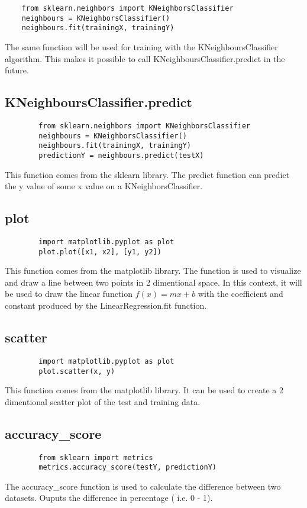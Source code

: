 \documentclass[titlepage, 11pt]{article}
\begin{document}
	\begin{lstlisting}
	from sklearn.neighbors import KNeighborsClassifier
	neighbours = KNeighborsClassifier()
	neighbours.fit(trainingX, trainingY)
	\end{lstlisting}
	The same function will be used for training with the KNeighboursClassifier algorithm. This makes it possible to call KNeighboursClassifier.predict in the future.
	
	\subsection{KNeighboursClassifier.predict}
	
	\begin{lstlisting}
		from sklearn.neighbors import KNeighborsClassifier
		neighbours = KNeighborsClassifier()
		neighbours.fit(trainingX, trainingY)
		predictionY = neighbours.predict(testX)
	\end{lstlisting}
	This function comes from the sklearn library. The predict function can predict the y value of some x value on a KNeighborsClassifier.
	\subsection{plot}
	
	\begin{lstlisting}
		import matplotlib.pyplot as plot
		plot.plot([x1, x2], [y1, y2])
	\end{lstlisting}
	This function comes from the matplotlib library. The function is used to visualize and draw a line between two points in 2 dimentional space. In this context, it will be used to draw the linear function $ f(x) = mx + b $ with the coefficient and constant produced by the LinearRegression.fit function.
	
	\subsection{scatter}
	
	\begin{lstlisting}
		import matplotlib.pyplot as plot
		plot.scatter(x, y)
	\end{lstlisting}
	This function comes from the matplotlib library. It can be used to create a 2 dimentional scatter plot of the test and training data.
	
	\subsection{accuracy\_score}
	\begin{lstlisting}
		from sklearn import metrics
		metrics.accuracy_score(testY, predictionY)
	\end{lstlisting}
	The accuracy\_score function is used to calculate the difference between two datasets. Ouputs the difference in percentage ( i.e. 0 - 1).
\end{document}
